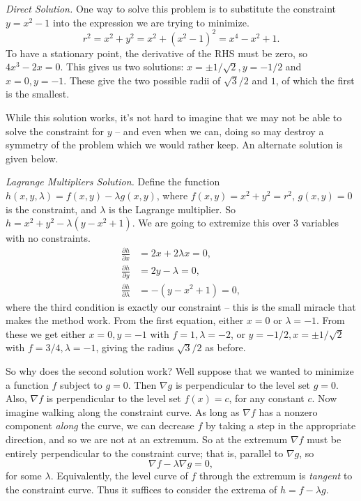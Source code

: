 \documentclass[a4paper]{scrartcl}
\begin{document}
\emph{Direct Solution.} One way to solve this problem is to substitute the constraint $y = x^2 - 1$ into the expression we are trying to minimize.
$$
r^2 = x^2 + y^2 = x^2 + (x^2 - 1)^2 = x^4 - x^2 + 1.
$$
To have a stationary point, the derivative of the RHS must be zero, so $4x^3 - 2x = 0$. This gives us two solutions: $x = \pm 1/\sqrt{2}, y = - 1/2$ and $x = 0, y = -1$. These give the two possible radii of $\sqrt{3}/2$ and $1$, of which the first is the smallest.

While this solution works, it's not hard to imagine that we may not be able to solve the constraint for $y$ -- and even when we can, doing so may destroy a symmetry of the problem which we would rather keep. An alternate solution is given below.

\emph{Lagrange Multipliers Solution.} Define the function $h(x, y, \lambda) = f(x, y) - \lambda g(x, y)$, where $f(x, y) = x^2 + y^2 = r^2$, $g(x, y) = 0$ is the constraint, and $\lambda$ is the Lagrange multiplier. So $h = x^2 + y^2 - \lambda (y - x^2 + 1)$. We are going to extremize this over $3$ variables with no constraints.
\begin{align*}
	\frac{\partial h}{\partial x} &= 2x + 2 \lambda x = 0, \\
	\frac{\partial h}{\partial y} &= 2y - \lambda  = 0, \\
	\frac{\partial h}{\partial \lambda} &= -(y - x^2 + 1) = 0,
\end{align*}
where the third condition is exactly our constraint -- this is the small miracle that makes the method work. From the first equation, either $x = 0$ or $\lambda = -1$. From these we get either $x = 0, y = -1$ with $f = 1, \lambda = -2$, or $y = -1/2, x = \pm 1/\sqrt{2}$ with $f = 3/4, \lambda = -1$, giving the radius $\sqrt{3}/2$ as before.

So why does the second solution work? Well suppose that we wanted to minimize a function $f$ subject to $g = 0$. Then $\nabla g$ is perpendicular to the level set $g = 0$. Also, $\nabla f$ is perpendicular to the level set $f(x) = c$, for any constant $c$. Now imagine walking along the constraint curve. As long as $\nabla f$ has a nonzero component \emph{along} the curve, we can decrease $f$ by taking a step in the appropriate direction, and so we are not at an extremum. So at the extremum $\nabla f$ must be entirely perpendicular to the constraint curve; that is, parallel to $\nabla g$, so
$$
\nabla f - \lambda \nabla g = 0,
$$
for some $\lambda$. Equivalently, the level curve of $f$ through the extremum is \emph{tangent} to the constraint curve. Thus it suffices to consider the extrema of $h = f - \lambda g$.
\end{document}
